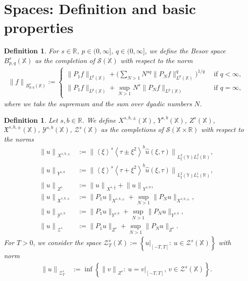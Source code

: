 \documentclass[reqno]{amsart}
\theoremstyle{Definitionl}
\theoremstyle{Definitionk}
\newtheorem{defk}[defi]{Definition}
\theoremstyle{definition}
\theoremstyle{Satzk}
\theoremstyle{Satzl}
\theoremstyle{Bemerkung}
\begin{document}
\section{Spaces: Definition and basic properties}
\begin{defk}
For $s\in\mathbb R$, $p\in(0,\infty]$, $q\in(0,\infty]$, we define the \emph{Besov space} $B_{p,q}^s(\mathbb X)$ as the completion of $\mathcal S(\mathbb X)$ with respect to the norm
\begin{align*}
{\|f\|}_{B^s_{p,q}(\mathbb X)}:=\begin{cases}\|P_{1}f\|_{L^p(\mathbb X)}+\big(\sum_{N>1}N^{sq}\|P_Nf\|_{L^p(\mathbb X)}^q\big)^{1/q}&\,\text{ if }q<\infty,\\
\|P_{1}f\|_{L^p(\mathbb X)}+\sup_{N>1}N^s\|P_Nf\|_{L^p(\mathbb X)}&\,\text{ if }q=\infty,
\end{cases}
\end{align*}
where we take the supremum and the sum over dyadic numbers $N$. 
\end{defk}
\begin{defk}\label{D1}
Let $s,b\in\mathbb R$. We define $X^{s,b,\pm}(\mathbb X)$, $Y^{s,b}(\mathbb X)$, $Z^s(\mathbb X)$, $\mathfrak X^{s,b,\pm}(\mathbb X)$, $\mathcal Y^{s,b}(\mathbb X)$, $\mathcal Z^s(\mathbb X)$ as the completions of $\mathcal S(\mathbb X\times\mathbb R)$ with respect to the norms
\begin{align*}
{\|u\|}_{X^{s,b,\pm}}&\,:= {\|\left\langle\xi\right\rangle^s\left\langle\tau\pm\xi^2\right\rangle^b\widehat{u}(\xi,\tau)\|}_{L^2_\xi(\mathbb Y) L^2_\tau(\mathbb R)},\\
{\|u\|}_{Y^{s,b}}&\,:= {\|\left\langle\xi\right\rangle^s\left\langle\tau+\xi^2\right\rangle^b\widehat{u}(\xi,\tau)\|}_{L^2_\xi(\mathbb Y) L^1_\tau(\mathbb R)},\\
{\|u\|}_{Z^s}&\,:= {\|u\|}_{X^{s,\frac12}}+ {\|u\|}_{Y^{s,0}},\\
{\|u\|}_{\mathfrak X^{s,b,\pm}}&\,:= \|P_{1}u\|_{X^{s,b,\pm}}+\sup_{N>1}\|P_Nu\|_{X^{s,b,\pm}},\\
{\|u\|}_{\mathcal Y^{s,b}}&\,:= \|P_{1}u\|_{Y^{s,b}}+\sup_{N>1}\|P_Nu\|_{Y^{s,b}},\\
{\|u\|}_{\mathcal Z^{s}}&\,:= \|P_{1}u\|_{Z^{s}}+\sup_{N>1}\|P_Nu\|_{Z^{s}}.
\end{align*}
For $T>0$, we consider the space $\mathcal Z^s_T(\mathbb X):=\left\{u\big|_{[-T,T]}:\ u\in\mathcal Z^s(\mathbb X)\right\}$ with norm
\begin{align*}
{\|u\|}_{\mathcal Z^s_T}&\,:= \inf\left\{{\|v\|}_{Z^{s}}:\ u=v\big|_{[-T,T]},\, v\in\mathcal Z^s(\mathbb X)\right\}.
\end{align*}
\end{defk}
\end{document}
